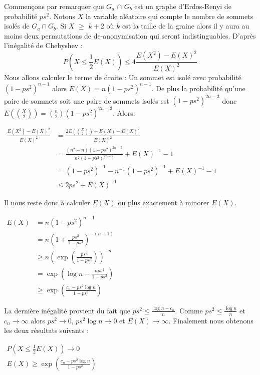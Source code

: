 \documentclass[letterpaper,10pt]{llncs}
\begin{document}
Commençons par remarquer que $G_a$ $\cap$ $G_b$ est un graphe d'Erdos-Renyi de probabilité $ps^{2}$. Notons $X$ la variable aléatoire qui compte le nombre de sommets isolés de $G_a \cap G_b$. Si $X$ $\geq$ $k+2$ où $k$ est la taille de la graine alors il y aura au moins deux permutations de de-anonymisation qui seront indistinguables. D'après l'inégalité de Chebyshev :
\[
   P(X \leq \frac{1}{2} E(X)) \leq 4 \frac{E(X^2) - E(X)^2}{E(X)^2}
\]
Nous allons calculer le terme de droite : Un sommet est isolé avec probabilité $(1-ps^2)^{n-1}$ alors $E(X) = n(1-ps^2)^{n-1}$. De plus la probabilité qu'une paire de sommets soit une paire de sommets isolés est $(1-ps^2)^{2n-3}$ donc $E(\binom{X}{2}) = \binom{n}{2}(1-ps^2)^{2n-3}$. Alors:

\begin{center}
$\begin{aligned}
   \frac{E(X^2) - E(X)^2}{E(X)^2} &= \frac{2E(\binom{X}{2}) + E(X) - E(X)^2}{E(X)^2} \\
   &= \frac{(n^2-n)(1-ps^2)^{2n-3}}{n^2 (1-ps^2)^{2n-2}} + E(X)^{-1}-1 \\
   &= (1-ps^2)^{-1}-n^{-1}(1-ps^2)^{-1}+E(X)^{-1}-1 \\
   &\leq 2ps^2 + E(X)^{-1}
\end{aligned}$
\end{center}

Il nous reste donc à calculer $E(X)$ ou plus exactement à minorer $E(X)$.

\begin{center}
$\begin{aligned}
   E(X) &= n(1-ps^2)^{n-1} \\
   &= n(1 + \frac{ps^2}{1-ps^2})^{-(n-1)} \\
   &\geq n(\exp(\frac{ps^2}{1-ps^2}))^{-n} \\
   &= \exp(\log n - \frac{nps^2}{1-ps^2}) \\
   &\geq \exp(\frac{c_n-ps^2\log n}{1-ps^2})
\end{aligned}$
\end{center}

La dernière inégalité provient du fait que $ps^2 \leq \frac{\log n - c_n}{n}$. Comme $ps^2 \leq \frac{\log n}{n}$ et $ c_n \rightarrow \infty$ alors $ps^2 \rightarrow 0$, $ps^2 \log n \rightarrow 0$ et $E(X) \rightarrow \infty$. Finalement nous obtenons les deux résultats suivants : 

\begin{center}
$\begin{aligned}
  P(X \leq \frac{1}{2} E(X)) \rightarrow 0 \\
  E(X) \geq  \exp(\frac{c_n-ps^2\log n}{1-ps^2})
\end{aligned}$
\end{center}
\end{document}
